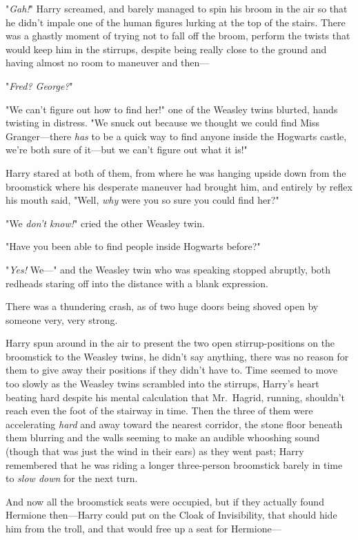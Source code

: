 "\emph{Gah!}" Harry screamed, and barely managed to spin his broom in the air
so that he didn't impale one of the human figures lurking at the top of the
stairs. There was a ghastly moment of trying not to fall off the broom, perform
the twists that would keep him in the stirrups, despite being really close to
the ground and having almost no room to maneuver and then—

"\emph{Fred? George?}"

"We can't figure out how to find her!" one of the Weasley twins blurted, hands
twisting in distress. "We snuck out because we thought we could find Miss
Granger—there \emph{has} to be a quick way to find anyone inside the Hogwarts
castle, we're both sure of it—but we can't figure out what it is!"

Harry stared at both of them, from where he was hanging upside down from the
broomstick where his desperate maneuver had brought him, and entirely by reflex
his mouth said, "Well, \emph{why} were you so sure you could find her?"

"We \emph{don't know!}" cried the other Weasley twin.

"Have you been able to find people inside Hogwarts before?"

"\emph{Yes!} We—" and the Weasley twin who was speaking stopped abruptly,
both redheads staring off into the distance with a blank expression.

There was a thundering crash, as of two huge doors being shoved open by someone
very, very strong.

Harry spun around in the air to present the two open stirrup-positions on the
broomstick to the Weasley twins, he didn't say anything, there was no reason
for them to give away their positions if they didn't have to. Time seemed to
move too slowly as the Weasley twins scrambled into the stirrups, Harry's heart
beating hard despite his mental calculation that Mr.~Hagrid, running, shouldn't
reach even the foot of the stairway in time. Then the three of them were
accelerating \emph{hard} and away toward the nearest corridor, the stone floor
beneath them blurring and the walls seeming to make an audible whooshing sound
(though that was just the wind in their ears) as they went past; Harry
remembered that he was riding a longer three-person broomstick barely in time
to \emph{slow down} for the next turn.

And now all the broomstick seats were occupied, but if they actually found
Hermione then—Harry could put on the Cloak of Invisibility, that should hide
him from the troll, and that would free up a seat for Hermione—


